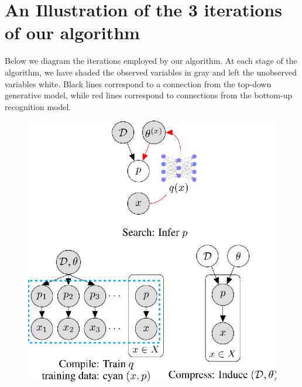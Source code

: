 \documentclass{article}
\begin{document}
\newpage

\section{An Illustration of the 3 iterations of our algorithm}
Below we diagram the iterations employed by our algorithm. At each stage of the algorithm,
we have shaded the observed variables in gray and left the unobserved variables white.
Black lines correspond to a connection from the top-down
generative model, while red lines correspond to connections from the bottom-up recognition model.

\begin{figure}[h]
\centering
  \includegraphics{figures/iterations.eps}

\end{figure}
\end{document}
